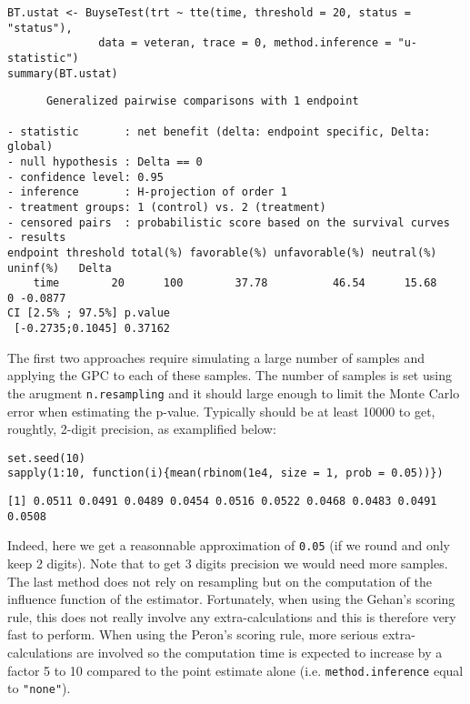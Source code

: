 \documentclass[12pt]{article}
\begin{document}
\lstset{language=r,label= ,caption= ,captionpos=b,numbers=none}
\begin{lstlisting}
BT.ustat <- BuyseTest(trt ~ tte(time, threshold = 20, status = "status"),
		      data = veteran, trace = 0, method.inference = "u-statistic") 
summary(BT.ustat)
\end{lstlisting}

\begin{verbatim}
      Generalized pairwise comparisons with 1 endpoint

- statistic       : net benefit (delta: endpoint specific, Delta: global) 
- null hypothesis : Delta == 0 
- confidence level: 0.95 
- inference       : H-projection of order 1
- treatment groups: 1 (control) vs. 2 (treatment) 
- censored pairs  : probabilistic score based on the survival curves
- results
endpoint threshold total(%) favorable(%) unfavorable(%) neutral(%) uninf(%)   Delta
    time        20      100        37.78          46.54      15.68        0 -0.0877
CI [2.5% ; 97.5%] p.value 
 [-0.2735;0.1045] 0.37162
\end{verbatim}

The first two approaches require simulating a large number of samples
and applying the GPC to each of these samples. The number of samples
is set using the arugment \texttt{n.resampling} and it should large enough to
limit the Monte Carlo error when estimating the p-value. Typically
should be at least 10000 to get, roughtly, 2-digit precision, as
examplified below:
\lstset{language=r,label= ,caption= ,captionpos=b,numbers=none}
\begin{lstlisting}
set.seed(10)
sapply(1:10, function(i){mean(rbinom(1e4, size = 1, prob = 0.05))})
\end{lstlisting}

\begin{verbatim}
[1] 0.0511 0.0491 0.0489 0.0454 0.0516 0.0522 0.0468 0.0483 0.0491 0.0508
\end{verbatim}
Indeed, here we get a reasonnable approximation of \texttt{0.05} (if we round
and only keep 2 digits). Note that to get 3 digits precision we would
need more samples. The last method does not rely on resampling but on
the computation of the influence function of the
estimator. Fortunately, when using the Gehan's scoring rule, this does
not really involve any extra-calculations and this is therefore very
fast to perform. When using the Peron's scoring rule, more serious
extra-calculations are involved so the computation time is expected to
increase by a factor 5 to 10 compared to the point estimate alone
(i.e. \texttt{method.inference} equal to \texttt{"none"}).
\end{document}

